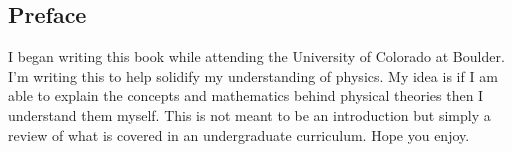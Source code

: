 \onecolumn
\subsection*{Preface}
	\indent
	I began writing this book while attending the University of Colorado at Boulder.
	I'm writing this to help solidify my understanding of physics.
	My idea is if I am able to explain the concepts and mathematics behind physical theories then I understand them myself.
	This is not meant to be an introduction but simply a review of what is covered in an undergraduate curriculum.
	Hope you enjoy.\\
	\begin{flushright}
	\end{flushright}
\twocolumn
